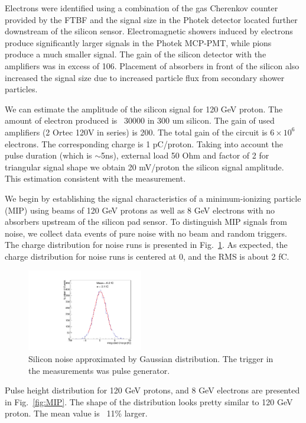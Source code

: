\documentclass[12pt]{article}
\begin{document}
Electrons were identified using a combination of the gas Cherenkov counter
provided by the FTBF and the signal size in the Photek detector located further
downstream of the silicon sensor. Electromagnetic showers induced by electrons
produce significantly larger signals in the Photek MCP-PMT, while pions produce
a much smaller signal. The gain of the silicon detector with the amplifiers was
in excess of 106. Placement of absorbers in front of the silicon also increased
the signal size due to increased particle flux from secondary shower particles. 

We can estimate the amplitude of the silicon signal for 120 GeV proton. The
amount of electron produced is ~30000 in 300 um silicon. The gain of used
amplifiers (2 Ortec 120V in series) is 200. The total gain of the circuit is
$6\times 10^6$ electrons. The corresponding charge is 1 pC/proton. Taking into account
the pulse duration (which is $\sim$5ns), external load 50 Ohm and factor of 2 for
triangular signal shape we obtain 20 mV/proton the silicon signal amplitude.
This estimation consistent with the measurement.

We begin by establishing the signal characteristics of a minimum-ionizing
particle (MIP) using beams of 120 GeV protons as well as 8   GeV electrons with no
absorbers upstream of the silicon pad sensor. To distinguish MIP signals from
noise, we collect data events of pure noise with no beam and random triggers.
The charge distribution for noise runs is presented in
Fig.~\ref{fig:noise}. As expected, the charge distribution for noise
runs is centered at 0, and the RMS is about 2 fC. 

\begin{figure}[htbp] 
\centering
\includegraphics[width=0.45\textwidth]{plots/NoiseNoBeam_charge.pdf} 
\caption{Silicon noise approximated by Gaussian distribution. The trigger in the measurements was pulse generator. } 
\label{fig:noise} 
\end{figure} 


Pulse height distribution for 120 GeV protons, and 8 GeV electrons are presented
in Fig.~\ref{fig:MIP}. The shape of the distribution looks pretty similar to 120
GeV proton. The mean value is ~11\% larger.
\end{document}
